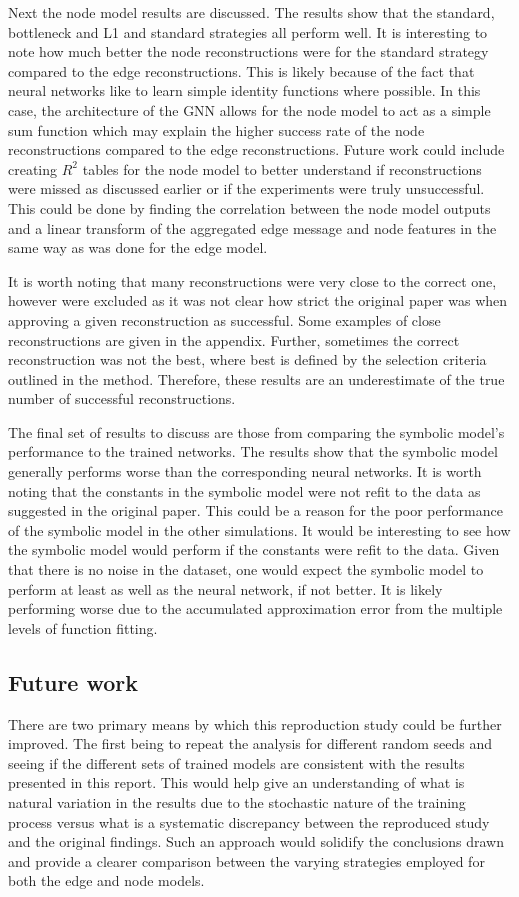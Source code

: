 \documentclass[11pt]{article}
\begin{document}
Next the node model results are discussed. The results show that the standard, bottleneck and L1 and standard strategies all perform well. It is interesting to note how much better the node reconstructions were for the standard strategy compared to the edge reconstructions. This is likely because of the fact that neural networks like to learn simple identity functions where possible. In this case, the architecture of the GNN allows for the node model to act as a simple sum function which may explain the higher success rate of the node reconstructions compared to the edge reconstructions. Future work could include creating $R^2$ tables for the node model to better understand if reconstructions were missed as discussed earlier or if the experiments were truly unsuccessful. This could be done by finding the correlation between the node model outputs and a linear transform of the aggregated edge message and node features in the same way as was done for the edge model.


It is worth noting that many reconstructions were very close to the correct one, however were excluded as it was not clear how strict the original paper was when approving a given reconstruction as successful. Some examples of close reconstructions are given in the appendix. Further, sometimes the correct reconstruction was not the best, where best is defined by the selection criteria outlined in the method. Therefore, these results are an underestimate of the true number of successful reconstructions.

The final set of results to discuss are those from comparing the symbolic model's performance to the trained networks. The results show that the symbolic model generally performs worse than the corresponding neural networks. It is worth noting that the constants in the symbolic model were not refit to the data as suggested in the original paper. This could be a reason for the poor performance of the symbolic model in the other simulations. It would be interesting to see how the symbolic model would perform if the constants were refit to the data. Given that there is no noise in the dataset, one would expect the symbolic model to perform at least as well as the neural network, if not better. It is likely performing worse due to the accumulated approximation error from the multiple levels of function fitting.

\subsection{Future work}
    There are two primary means by which this reproduction study could be further improved. The first being to repeat the analysis for different random seeds and seeing if the different sets of trained models are consistent with the results presented in this report. This would help give an understanding of what is natural variation in the results due to the stochastic nature of the training process versus what is a systematic discrepancy between the reproduced study and the original findings. Such an approach would solidify the conclusions drawn and provide a clearer comparison between the varying strategies employed for both the edge and node models.
\end{document}
